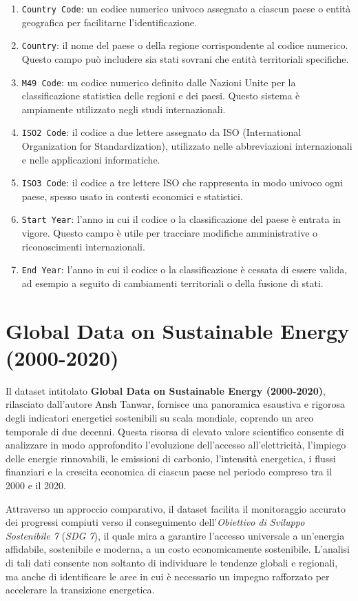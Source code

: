 \begin{enumerate}
\label{elenco_dati2}
    \item \texttt{Country Code}: un codice numerico univoco assegnato a ciascun paese o entità geografica per facilitarne l’identificazione.
    \item \texttt{Country}: il nome del paese o della regione corrispondente al codice numerico. Questo campo può includere sia stati sovrani che entità territoriali specifiche.
    \item \texttt{M49 Code}: un codice numerico definito dalle Nazioni Unite per la classificazione statistica delle regioni e dei paesi. Questo sistema è ampiamente utilizzato negli studi internazionali.
    \item \texttt{ISO2 Code}:  il codice a due lettere assegnato da ISO (International Organization for Standardization), utilizzato nelle abbreviazioni internazionali e nelle applicazioni informatiche.
    \item \texttt{ISO3 Code}: il codice a tre lettere ISO che rappresenta in modo univoco ogni paese, spesso usato in contesti economici e statistici.
    \item \texttt{Start Year}: l'anno in cui il codice o la classificazione del paese è entrata in vigore. Questo campo è utile per tracciare modifiche amministrative o riconoscimenti internazionali.
    \item \texttt{End Year}: l’anno in cui il codice o la classificazione è cessata di essere valida, ad esempio a seguito di cambiamenti territoriali o della fusione di stati.
\end{enumerate}


\section{Global Data on Sustainable Energy (2000-2020)}

Il dataset intitolato \textbf{Global Data on Sustainable Energy (2000-2020)}, rilasciato dall'autore Ansh Tanwar, fornisce una panoramica esaustiva e rigorosa degli indicatori energetici sostenibili su scala mondiale, coprendo un arco temporale di due decenni. Questa risorsa di elevato valore scientifico consente di analizzare in modo approfondito l'evoluzione dell'accesso all'elettricità, l'impiego delle energie rinnovabili, le emissioni di carbonio, l'intensità energetica, i flussi finanziari e la crescita economica di ciascun paese nel periodo compreso tra il 2000 e il 2020.

Attraverso un approccio comparativo, il dataset facilita il monitoraggio accurato dei progressi compiuti verso il conseguimento dell'\textit{Obiettivo di Sviluppo Sostenibile 7} (\textit{SDG 7}), il quale mira a garantire l'accesso universale a un'energia affidabile, sostenibile e moderna, a un costo economicamente sostenibile. L'analisi di tali dati consente non soltanto di individuare le tendenze globali e regionali, ma anche di identificare le aree in cui è necessario un impegno rafforzato per accelerare la transizione energetica.

